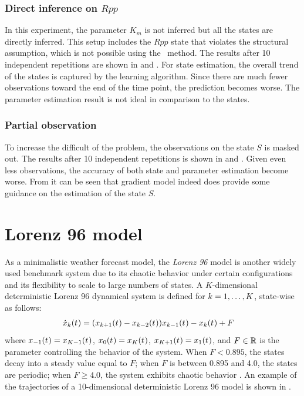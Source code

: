\subsubsection*{Direct inference on $Rpp$}

In this experiment, the parameter $K_m$ is not inferred but all the states are directly inferred.
This setup includes the $Rpp$ state that violates the structural assumption, which is not possible using the \algovgmgp\ method.
The results after 10 independent repetitions are shown in  and .
For state estimation, the overall trend of the states is captured by the learning algorithm.
Since there are much fewer observations toward the end of the time point, the prediction becomes worse.
The parameter estimation result is not ideal in comparison to the states.

\subsubsection*{Partial observation}

To increase the difficult of the problem, the observations on the state $S$ is masked out.
The results after 10 independent repetitions is shown in  and .
Given even less observations, the accuracy of both state and parameter estimation become worse.
From  it can be seen that gradient model indeed does provide some guidance on the estimation of the state $S$.

\section{Lorenz 96 model}
\label{sec-lorenz-96}

As a minimalistic weather forecast model, the \emph{Lorenz 96} model \citep{lorenz1996predictability} is another widely used benchmark system due to its chaotic behavior under certain configurations and its flexibility to scale to large numbers of states.
A $K$-dimensional deterministic Lorenz 96 dynamical system is defined for $k = 1,\dots,K$, state-wise as follows:
\begin{align}
    \dot{x}_{k}(t_{})
     & = (x_{k+1}(t_{}) - x_{k-2}(t_{}))x_{k-1}(t_{}) - x_{k}(t_{}) + F
    \label{eq-lorenz-96-drift}
\end{align}
where $x_{-1}(t_{}) = x_{K-1}(t_{})$, $x_{0}(t_{}) = x_{K}(t_{})$, $x_{K+1}(t_{})=x_{1}(t_{})$, and $F \in \mathbb{R}$ is the parameter controlling the behavior of the system.
When $F < 0.895$, the states decay into a steady value equal to $F$; when $F$ is between 0.895 and 4.0, the states are periodic; when $F \geqslant 4.0$, the system exhibits chaotic behavior \citep{vrettas2015variational}.
An example of the trajectories of a 10-dimensional deterministic Lorenz 96 model is shown in .

